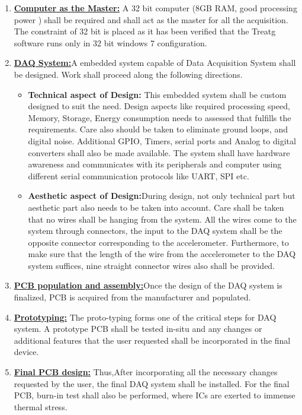 \documentclass{FR16}
\begin{document}
\begin{enumerate}
     \item \underline{\textbf{Computer as the Master:}} A 32 bit computer (8GB RAM, good processing power ) shall be required and shall act as the master  for all the acquisition. The constraint of 32 bit is placed as it has been verified that the Treatg software runs only in 32 bit windows 7 configuration.
    \item \underline{\textbf{DAQ System:}}A embedded system capable of Data Acquisition System  shall be designed. Work shall proceed along the following directions.
        \begin{itemize}
            \item \textbf{ Technical aspect of Design:} This embedded system shall be custom designed to suit the need. Design aspects like required  processing speed, Memory, Storage, Energy consumption needs to assessed that fulfills the requirements. Care also should be taken to eliminate ground loops, and digital noise. Additional GPIO, Timers, serial ports and Analog to digital converters shall also be made available. The system shall have hardware awareness and communicates with its peripherals and computer using different serial communication protocols like UART, SPI etc. 
            
            \item \textbf{ Aesthetic aspect of Design:}During design, not only technical part but aesthetic part also needs to be taken into account. Care shall be taken  that no wires shall be hanging from the system. All the wires come to the system through connectors, the input to the DAQ system shall be the opposite connector corresponding to the accelerometer. Furthermore, to make sure that the length of the wire from the accelerometer to the DAQ system suffices, nine straight connector wires also shall be provided.
        \end{itemize}
    \item \underline{\textbf{PCB population and assembly:}}Once the design of the DAQ system is finalized,  PCB is acquired from the  manufacturer and populated.
    \item \underline{\textbf{Prototyping:}} The proto-typing forms one of the critical steps for DAQ system. A prototype PCB shall be tested in-situ and any changes or additional features that the user requested shall be incorporated in the final device.
    
    \item \underline{\textbf{Final PCB design:}} Thus,After incorporating all the necessary changes requested by the user, the final DAQ system shall be installed. For the final PCB,  burn-in test shall also be performed, where ICs are exerted to immense thermal stress.
    
    \end{enumerate}  
\end{document}
